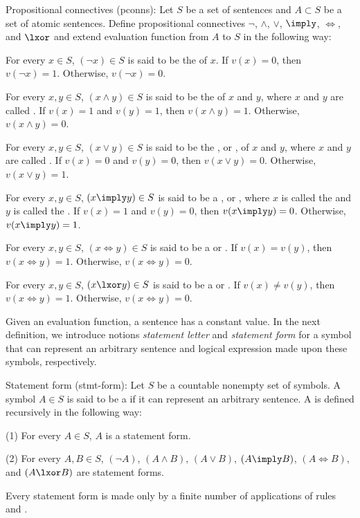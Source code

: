  Propositional connectives (pconns):
  Let $S$ be a set of sentences and $A \subset S$ be a set of atomic sentences.
  Define propositional connectives $\lnot$, $\land$, $\lor$, $\imply$, $\iff$,
  and $\lxor$ and extend evaluation function from $A$ to $S$ in the following
  way:
  \list
    \item For every $x \in S$, $(\lnot x) \in S$ is said to be the
       of $x$. If $v(x) = 0$, then $v(\lnot x) = 1$. Otherwise,
      $v(\lnot x) = 0$.
    \item For every $x, y \in S$, $(x\land y) \in S$ is said to be the
       of $x$ and $y$, where $x$ and $y$ are called
      . If $v(x) = 1$ and $v(y) = 1$, then $v(x\land y) = 1$.
      Otherwise, $v(x\land y) = 0$.
    \item For every $x, y \in S$, $(x\lor y) \in S$ is said to be the
      , or , of $x$ and $y$, where $x$ and
      $y$ are called . If $v(x) = 0$ and $v(y) = 0$, then $v(x
      \lor y) = 0$. Otherwise, $v(x\lor y) = 1$.
    \item For every $x, y \in S$, $(x\imply y) \in S$ is said to be a
      , or , where $x$ is called the
       and $y$ is called the . If $v(x) = 1$
      and $v(y) = 0$, then $v(x\imply y) = 0$. Otherwise, $v(x\imply y) = 1$.
    \item For every $x, y \in S$, $(x\iff y) \in S$ is said to be a
       or . If $v(x) = v(y)$,
      then $v(x\iff y) = 1$. Otherwise, $v(x\iff y) = 0$.
    \item For every $x, y \in S$, $(x\lxor y) \in S$ is said to be a
       or . If $v(x) \neq v(y)
      $, then $v(x\iff y) = 1$. Otherwise, $v(x\iff y) = 0$.
  \quit
\quit

Given an evaluation function, a sentence has a constant value. In the next
definition, we introduce notions {\it statement letter} and {\it statement
form} for a symbol that can represent an arbitrary sentence and logical
expression made upon these symbols, respectively.

 Statement form (stmt-form):
  Let $S$ be a countable nonempty set of symbols. A symbol $A \in S$ is said to
  be a  if it can represent an arbitrary sentence. A
   is defined recursively in the following way:
    \item(1) For every $A \in S$, $A$ is a statement form.
    \item(2) For every $A, B \in S$, $(\lnot A)$, $(A\land B)$, $(A\lor B)$,
      $(A\imply B)$, $(A\iff B)$, and $(A\lxor B)$ are statement forms.
    \item Every statement form is made only by a finite number of applications
      of rules  and .
  \quit
\quit

\fi
